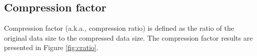 \subsection{Compression factor}

Compression factor (a.k.a., compression ratio) is defined as the ratio of the original data size to the compressed data size. 
The compression factor results are presented in Figure \ref{fig:cratio}.

